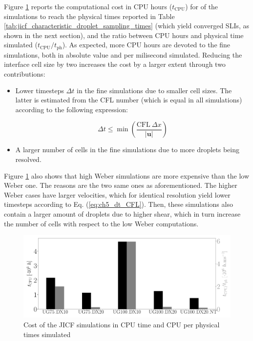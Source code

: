 Figure \ref{fig:SLI_cost_convergence_all} reports the computational cost in CPU hours ($t_\mathrm{CPU}$) for of the simulations to reach the physical times reported in Table \ref{tab:jicf_characteristic_droplet_sampling_times} (which yield converged SLIs, as shown in the next section), and the ratio between CPU hours and physical time simulated ($t_\mathrm{CPU}/t_\mathrm{ph}$). As expected, more CPU hours are devoted to the fine simulations, both in absolute value and per milisecond simulated. Reducing the interface cell size by two increases the cost by a larger extent through two contributions: 

\begin{itemize}

	\item Lower timesteps $\Delta t$ in the fine simulations due to smaller cell sizes. The latter is estimated from the CFL number (which is equal in all simulations) according to the following expression:

\begin{equation}
\label{eq:ch5_dt_CFL}
\Delta t \leq \min \left( \frac{\mathrm{CFL} ~   \Delta x }{|\textbf{u}|} \right)
\end{equation}

	\item A larger number of cells in the fine simulations due to more droplets being resolved.

\end{itemize}

Figure \ref{fig:SLI_cost_convergence_all} also shows that high Weber simulations are more expensive than the low Weber one. The reasons are the two same ones as aforementioned. The higher Weber cases have larger velocities, which for identical resolution yield lower timesteps according to Eq. (\ref{eq:ch5_dt_CFL}). Then, these simulations also contain a larger amount of droplets due to higher shear, which in turn increase the number of cells with respect to the low Weber computations.


\begin{figure}[ht]
	\centering
   \includegraphics[scale=0.225]{./part2_developments/figures_ch5_resolved_JICF/SLI_cost_for_convergence/cost_all_simulations}
   \caption{Cost of the JICF simulations in CPU time and CPU per physical times simulated}
   \label{fig:SLI_cost_convergence_all}
\end{figure}




